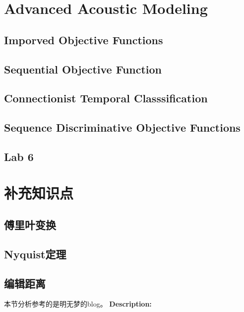 \section{Advanced Acoustic Modeling}
\subsection{Imporved Objective Functions}

\subsection{Sequential Objective Function}

\subsection{Connectionist Temporal Classsification}

\subsection{Sequence Discriminative Objective Functions}

\subsection{Lab 6}


\section{补充知识点}

\subsection{傅里叶变换}

\subsection{Nyquist定理}

\subsection{编辑距离}
\label{sub:edit-distance}
本节分析参考的是明无梦的blog。
{\bf Description:}

